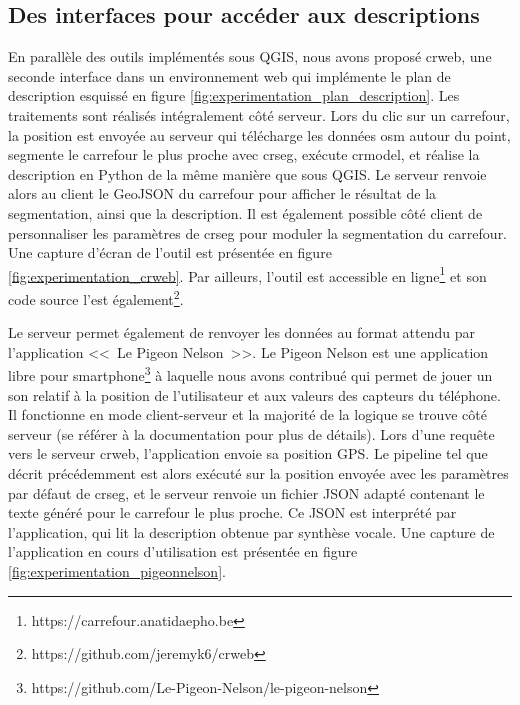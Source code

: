 \subsection{Des interfaces pour accéder aux descriptions}


En parallèle des outils implémentés sous QGIS, nous avons proposé crweb, une seconde interface dans un environnement web qui implémente le plan de description esquissé en figure \ref{fig:experimentation_plan_description}. Les traitements sont réalisés intégralement côté serveur. Lors du clic sur un carrefour, la position est envoyée au serveur qui télécharge les données \gls{osm} autour du point, segmente le carrefour le plus proche avec crseg, exécute crmodel, et réalise la description en Python de la même manière que sous QGIS. Le serveur renvoie alors au client le GeoJSON du carrefour pour afficher le résultat de la segmentation, ainsi que la description. Il est également possible côté client de personnaliser les paramètres de crseg pour moduler la segmentation du carrefour. Une capture d'écran de l'outil est présentée en figure \ref{fig:experimentation_crweb}. Par ailleurs, l'outil est accessible en ligne\footnote{https://carrefour.anatidaepho.be} et son code source l'est également\footnote{https://github.com/jeremyk6/crweb}.

\newpar{}


Le serveur permet également de renvoyer les données au format attendu par l'application <<~Le Pigeon Nelson~>>. Le Pigeon Nelson est une application libre pour smartphone\footnote{https://github.com/Le-Pigeon-Nelson/le-pigeon-nelson} à laquelle nous avons contribué qui permet de jouer un son relatif à la position de l'utilisateur et aux valeurs des capteurs du téléphone. Il fonctionne en mode client-serveur et la majorité de la logique se trouve côté serveur (se référer à la documentation pour plus de détails). Lors d'une requête vers le serveur crweb, l'application envoie sa position GPS. Le pipeline tel que décrit précédemment est alors exécuté sur la position envoyée avec les paramètres par défaut de crseg, et le serveur renvoie un fichier JSON adapté contenant le texte généré pour le carrefour le plus proche. Ce JSON est interprété par l'application, qui lit la description obtenue par synthèse vocale. Une capture de l'application en cours d'utilisation est présentée en figure \ref{fig:experimentation_pigeonnelson}.

